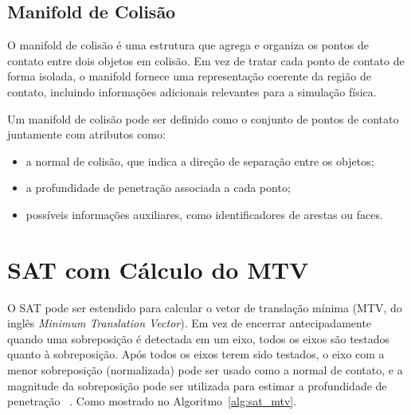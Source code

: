 \subsection*{Manifold de Colisão}

O manifold de colisão é uma estrutura que agrega e organiza os pontos de contato entre dois objetos em colisão. Em vez de tratar cada ponto de contato de forma isolada, o manifold fornece uma representação coerente da região de contato, incluindo informações adicionais relevantes para a simulação física.

Um manifold de colisão pode ser definido como o conjunto de pontos de contato juntamente com atributos como:
\begin{itemize}
    \item a normal de colisão, que indica a direção de separação entre os objetos;
    \item a profundidade de penetração associada a cada ponto;
    \item possíveis informações auxiliares, como identificadores de arestas ou faces.
\end{itemize}

\section{SAT com Cálculo do MTV}

O SAT pode ser estendido para calcular o vetor de translação mínima (MTV, do inglês \textit{Minimum Translation Vector}). Em vez de encerrar antecipadamente quando uma sobreposição é detectada em um eixo, todos os eixos são testados quanto à sobreposição. Após todos os eixos terem sido testados, o eixo com a menor sobreposição (normalizada) pode ser usado como a normal de contato, e a magnitude da sobreposição pode ser utilizada para estimar a profundidade de penetração
~\cite{ericson2004real}. Como mostrado no Algoritmo~\ref{alg:sat_mtv}.


